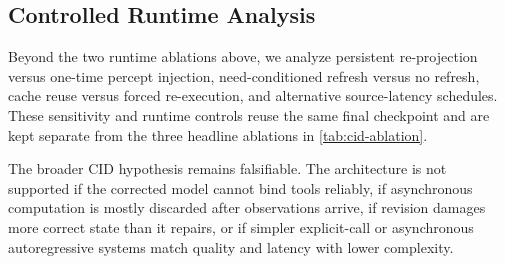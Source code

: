 \subsection{Controlled Runtime Analysis}
\label{sec:runtime-analysis}

Beyond the two runtime ablations above, we analyze persistent re-projection versus one-time percept injection, need-conditioned refresh versus no refresh, cache reuse versus forced re-execution, and alternative source-latency schedules. These sensitivity and runtime controls reuse the same final checkpoint and are kept separate from the three headline ablations in \cref{tab:cid-ablation}.

The broader CID hypothesis remains falsifiable. The architecture is not supported if the corrected model cannot bind tools reliably, if asynchronous computation is mostly discarded after observations arrive, if revision damages more correct state than it repairs, or if simpler explicit-call or asynchronous autoregressive systems match quality and latency with lower complexity.
